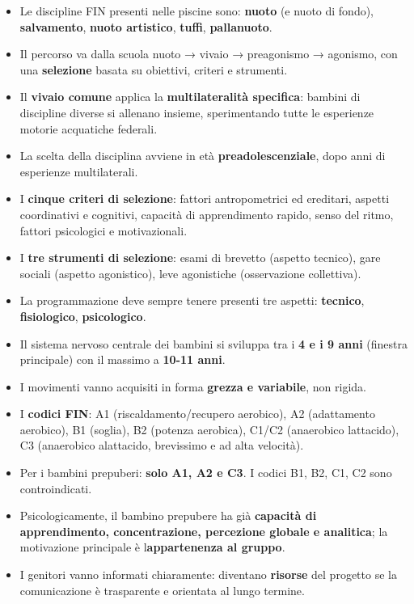 \documentclass[a4paper,11pt]{article}
\providecommand{\tightlist}{%
  \setlength{\itemsep}{0pt}\setlength{\parskip}{0pt}}
\begin{document}
\begin{itemize}
      \tightlist
      \item
            Le discipline FIN presenti nelle piscine sono: \textbf{nuoto} (e nuoto
            di fondo), \textbf{salvamento}, \textbf{nuoto artistico},
            \textbf{tuffi}, \textbf{pallanuoto}.
      \item
            Il percorso va dalla scuola nuoto → vivaio → preagonismo → agonismo,
            con una \textbf{selezione} basata su obiettivi, criteri e strumenti.
      \item
            Il \textbf{vivaio comune} applica la \textbf{multilateralità
                  specifica}: bambini di discipline diverse si allenano insieme,
            sperimentando tutte le esperienze motorie acquatiche federali.
      \item
            La scelta della disciplina avviene in età \textbf{preadolescenziale},
            dopo anni di esperienze multilaterali.
      \item
            I \textbf{cinque criteri di selezione}: fattori antropometrici ed
            ereditari, aspetti coordinativi e cognitivi, capacità di apprendimento
            rapido, senso del ritmo, fattori psicologici e motivazionali.
      \item
            I \textbf{tre strumenti di selezione}: esami di brevetto (aspetto
            tecnico), gare sociali (aspetto agonistico), leve agonistiche
            (osservazione collettiva).
      \item
            La programmazione deve sempre tenere presenti tre aspetti:
            \textbf{tecnico}, \textbf{fisiologico}, \textbf{psicologico}.
      \item
            Il sistema nervoso centrale dei bambini si sviluppa tra i \textbf{4 e
                  i 9 anni} (finestra principale) con il massimo a \textbf{10-11 anni}.
      \item
            I movimenti vanno acquisiti in forma \textbf{grezza e variabile}, non
            rigida.
      \item
            I \textbf{codici FIN}: A1 (riscaldamento/recupero aerobico), A2
            (adattamento aerobico), B1 (soglia), B2 (potenza aerobica), C1/C2
            (anaerobico lattacido), C3 (anaerobico alattacido, brevissimo e ad
            alta velocità).
      \item
            Per i bambini prepuberi: \textbf{solo A1, A2 e C3}. I codici B1, B2,
            C1, C2 sono controindicati.
      \item
            Psicologicamente, il bambino prepubere ha già \textbf{capacità di
                  apprendimento, concentrazione, percezione globale e analitica}; la
            motivazione principale è l\textquotesingle{}\textbf{appartenenza al
                  gruppo}.
      \item
            I genitori vanno informati chiaramente: diventano \textbf{risorse} del
            progetto se la comunicazione è trasparente e orientata al lungo
            termine.
\end{itemize}
\end{document}
